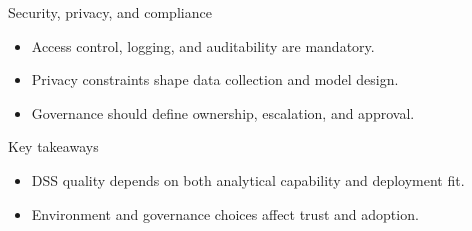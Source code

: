 \documentclass[aspectratio=169,11pt]{beamer}
\begin{document}
\begin{frame}{Security, privacy, and compliance}
  \begin{itemize}
    \item Access control, logging, and auditability are mandatory.
    \item Privacy constraints shape data collection and model design.
    \item Governance should define ownership, escalation, and approval.
  \end{itemize}
\end{frame}


\begin{frame}{Key takeaways}
  \begin{itemize}
    \item DSS quality depends on both analytical capability and deployment fit.
    \item Environment and governance choices affect trust and adoption.
  \end{itemize}
\end{frame}
\end{document}
